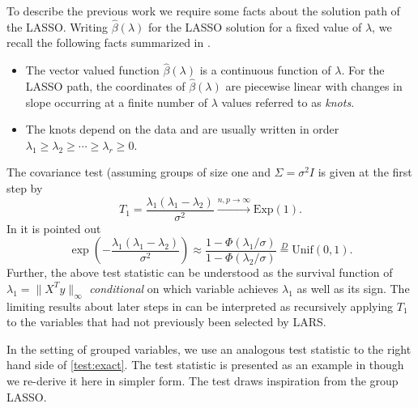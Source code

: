 \documentclass{imsart}
\begin{document}
To describe the previous work we require some facts about the solution path
of the LASSO.
Writing $\hat \beta(\lambda)$ for the LASSO solution for a fixed value of $\lambda$, we recall
the following facts summarized in \cite{significance:LASSO,tibshirani_LASSO_uniqueness}.

\begin{itemize}

  \item The vector valued function $\hat \beta(\lambda)$ is a
    continuous function of $\lambda$. For the LASSO path, the
    coordinates of $\hat \beta(\lambda)$ are piecewise linear with
    changes in slope occurring at a finite number of $\lambda$ values
    referred to as \emph{knots}. 
    \item The knots depend on the data and are
    usually written in order $\lambda_1 \geq \lambda_2 \geq \cdots
    \geq \lambda_r \geq 0$. 

\end{itemize}

The covariance test (assuming groups of size one and $\Sigma = \sigma^2 I$ is given at the first step by
\begin{equation}
\label{eq:covtest}
T_1 = \frac{\lambda_1(\lambda_1-\lambda_2)}{\sigma^2} \overset{n,p \to \infty}{\to} \text{Exp}(1).
\end{equation}
In \cite{tests:adaptive} it is pointed out 
\begin{equation}
\label{test:exact}
\exp\left(- \frac{\lambda_1(\lambda_1-\lambda_2)}{\sigma^2} \right) \approx \frac{1 - \Phi(\lambda_1/\sigma)}{1 - \Phi(\lambda_2 / \sigma)} \overset{D}{=} \text{Unif}(0,1).
\end{equation}
Further, the above test statistic can be understood as the survival function of $\lambda_1 = \|X^Ty\|_{\infty}$
{\em conditional} on which variable achieves $\lambda_1$ as well as its sign.
The limiting results about later steps in \cite{significance:LASSO} can
be interpreted as
recursively applying $T_1$ to the variables that had not previously been selected by LARS.

In the setting of grouped variables, we use an analogous test statistic to
the right hand side of \eqref{test:exact}. The test statistic is presented as an example
in \cite{tests:adaptive} though we re-derive it here in simpler form. The test draws inspiration
from the group LASSO.
\end{document}
